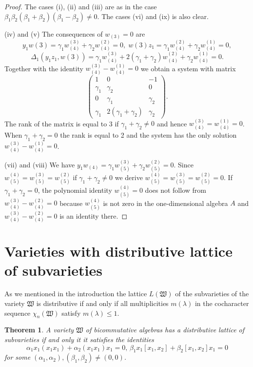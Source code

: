 \documentclass{amsart}
\newtheorem{theorem}{Theorem}[section]
\theoremstyle{definition}
\begin{document}
\begin{proof}
The cases (i), (ii) and (iii) are as in the case $\beta_1\beta_2(\beta_1+\beta_2)(\beta_1-\beta_2)\not=0$.
The cases (vi) and (ix) is also clear.

(iv) and (v) The consequences of $w_{(3)}=0$ are
\[
y_1w(3)=\gamma_1w_{(4)}^{(3)}+\gamma_2w_{(4)}^{(2)}=0,\;w(3)z_1=\gamma_1w_{(4)}^{(2)}+\gamma_2w_{(4)}^{(1)}=0,
\]
\[
\Delta_1(y_1z_1,w(3))=\gamma_1w_{(4)}^{(3)}+2(\gamma_1+\gamma_2)w_{(4)}^{(2)}+\gamma_2w_{(4)}^{(1)}=0.
\]
Together with the identity $w_{(4)}^{(3)}-w_{(4)}^{(1)}=0$ we obtain a system with matrix
\[
\left(\begin{matrix}1&0&-1\\
\gamma_1&\gamma_2&0\\
0&\gamma_1&\gamma_2\\
\gamma_1&2(\gamma_1+\gamma_2)&\gamma_2\end{matrix}\right).
\]
The rank of the matrix is equal to 3 if $\gamma_1+\gamma_2\not=0$ and hence $w_{(4)}^{(3)}=w_{(4)}^{(1)}=0$.
When $\gamma_1+\gamma_2=0$ the rank is equal to 2 and the system has the only solution $w_{(4)}^{(3)}-w_{(4)}^{(1)}=0$.

(vii) and (viii) We have $y_1w_{(4)}=\gamma_1w_{(5)}^{(3)}+\gamma_2w_{(5)}^{(2)}=0$. Since $w_{(5)}^{(4)}=w_{(5)}^{(3)}=w_{(5)}^{(2)}$
if $\gamma_1+\gamma_2\not=0$ we derive $w_{(5)}^{(4)}=w_{(5)}^{(3)}=w_{(5)}^{(2)}=0$. If $\gamma_1+\gamma_2=0$, the polynomial identity $w_{(5)}^{(4)}=0$
does not follow from $w_{(4)}^{(3)}-w_{(4)}^{(2)}=0$ because $w_{(5)}^{(4)}$ is not zero in the one-dimensional algebra $A$ and
$w_{(4)}^{(3)}-w_{(4)}^{(2)}=0$ is an identity there.
\end{proof}

\section{Varieties with distributive lattice of subvarieties}
As we mentioned in the introduction the lattice $L({\mathfrak W})$ of the subvarieties of the variety $\mathfrak W$ is distributive if and only if
all multiplicities $m(\lambda)$ in the cocharacter sequence $\chi_n({\mathfrak W})$ satisfy $m(\lambda)\leq 1$.

\begin{theorem}\label{distributive lattice}
A variety $\mathfrak W$ of bicommutative algebras has a distributive lattice of subvarieties if and only it it satisfies the identities
\[
\alpha_1x_1(x_1x_1)+\alpha_2(x_1x_1)x_1=0,\,\beta_1x_1[x_1,x_2]+\beta_2[x_1,x_2]x_1=0
\]
for some $(\alpha_1,\alpha_2),(\beta_1,\beta_2)\not=(0,0)$.
\end{theorem}
\end{document}
